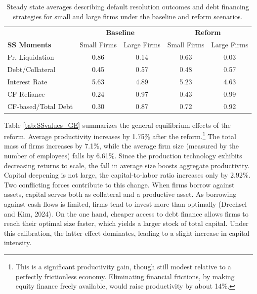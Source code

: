 \documentclass[12pt]{article}
\begin{document}
\begin{table}[H]
    \centering
    \begin{tabular}{lcccc}
    \midrule
     & \multicolumn{2}{c}{\textbf{Baseline}} & \multicolumn{2}{c}{\textbf{Reform}} \\ 
    \textbf{SS Moments} & Small Firms & Large Firms & Small Firms & Large Firms \\ 
    \midrule
    Pr. Liquidation & 0.86 & 0.14 & 0.63 & 0.03 \\ 
    Debt/Collateral & 0.45 & 0.57 & 0.48 & 0.57 \\ 
    Interest Rate & 5.63 & 4.89 & 5.23 & 4.63 \\  
    CF Reliance & 0.24 & 0.97 & 0.43 & 0.99 \\ 
    CF-based/Total Debt & 0.30 & 0.87 & 0.72 & 0.92 \\ 
    \bottomrule
    \end{tabular}
    \caption{\small Steady state averages describing default resolution outcomes and debt financing strategies for small and large firms under the baseline and reform scenarios.}
    \label{tab:SSvalues_firms}
\end{table}
Table \ref{tab:SSvalues_GE} summarizes the general equilibrium effects of the reform. Average productivity increases by 1.75\% after the reform.\footnote{This is a significant productivity gain, though still modest relative to a perfectly frictionless economy. Eliminating financial frictions, by making equity finance freely available, would raise productivity by about 14\%.} The total mass of firms increases by 7.1\%, while the average firm size (measured by the number of employees) falls by 6.61\%. Since the production technology exhibits decreasing returns to scale, the fall in average size boosts aggregate productivity. Capital deepening is not large, the capital-to-labor ratio increases only by 2.92\%. Two conflicting forces contribute to this change. When firms borrow against assets, capital serves both as collateral and a productive asset. As borrowing against cash flows is limited, firms tend to invest more than optimally (Drechsel and Kim, 2024). On the one hand, cheaper access to debt finance allows firms to reach their optimal size faster, which yields a larger stock of total capital. Under this calibration, the latter effect dominates, leading to a slight increase in capital intensity. 
\end{document}
